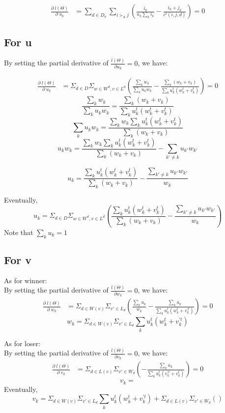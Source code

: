 \documentclass{article}
\begin{document}
\begin{align}
\frac{\partial \;l(\Theta) }{\partial \;u_k}
 &=\sum_{d\in D_u} \sum_{i \succ_d j} (\frac{i_k}{u_k \sum_k i_k}-\frac{i_k+j_k}{c^t(i, j, d)}) =0
\end{align}




\subsection{For u}
By setting the partial derivative of $\frac{l(\Theta)}{\partial u_k}=0$, we have:

\begin{align}
\frac{\partial \;l(\Theta) }{\partial \;u_k}
 &= \Sigma_{d \in D} \Sigma_{w\in W^d, v\in L^d}(\frac{\sum_k w_k}{\sum_k u_k w_k}-\frac{\sum_k(w_k+v_k)}{\sum_k u_k^t(w_k^t +v_k^t)}) =0
\end{align}
$$ \frac{\sum_k w_k}{\sum_k u_k w_k}=\frac{\sum_k(w_k+v_k)}{\sum_k u_k^t(w_k^t +v_k^t)}$$
$$ \sum_k u_k w_k =\frac{ \sum_k w_k \sum_k u_k^t(w_k^t +v_k^t)}{\sum_k(w_k+v_k)} $$
$$ u_k w_k  = \frac{\sum_k w_k \sum_k u_k^t(w_k^t +v_k^t)}{\sum_k(w_k+v_k)} -\sum_{k' \neq k} u_{k'} w_{k'} $$

$$ u_k = \frac{\sum_k u_k^t(w_k^t +v_k^t)}{\sum_k(w_k+v_k)} - \frac{\sum_{k' \neq k} u_{k'} w_{k'}}{w_k}$$

Eventually,
$$ u_k = \Sigma_{d \in D} \Sigma_{w\in W^d, v\in L^d}(\frac{\sum_k u_k^t(w_k^t +v_k^t)}{\sum_k(w_k+v_k)} - \frac{\sum_{k' \neq k} u_{k'} w_{k'}}{w_k})$$
Note that $\sum_k u_k=1$

\subsection{For v}

As for winner:\\
By setting the partial derivative of $\frac{l(\Theta)}{\partial w_k}=0$, we have:
\begin{align}
\frac{\partial \;l(\Theta)}{\partial \;w_k}
&=  \Sigma_{d \in W(v)} \Sigma_{v'\in L_d}(\frac{\sum_k u_k}{w_k}-\frac{\sum_k u_k}{\sum_k u_k^t(w_k^t +v_k^{'t})})=0
\end{align}
$$ w_k =\Sigma_{d \in W(v)} \Sigma_{v'\in L_d} \sum_k u_k^t(w_k^t +v_k^{'t}) $$

As for loser:\\
By setting the partial derivative of $\frac{l(\Theta)}{\partial v_k}=0$, we have:
\begin{align}
\frac{\partial \;l(\Theta)}{\partial \;v_k}
&=  \Sigma_{d \in L(v)} \Sigma_{v'\in W_d}(-\frac{\sum_k u_k}{\sum_k u_k^t(v_k^{'t} +v_k^t)})=0
\end{align}
$$ v_k =  $$
Eventually,
$$ v_k = \Sigma_{d \in W(v)} \Sigma_{v'\in L_d} \sum_k u_k^t(w_k^t +v_k^{'t}) +\Sigma_{d \in L(v)} \Sigma_{v'\in W_d}()$$
\end{document}
